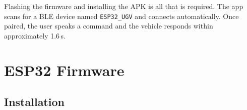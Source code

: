 \documentclass[conference]{IEEEtran}
\begin{document}
	
	Flashing the firmware and installing the APK is all that is required.
	The app scans for a BLE device named \texttt{ESP32\_UGV} and connects
	automatically. Once paired, the user speaks a command and the vehicle
	responds within approximately 1.6\,s.
	

	
\section{ESP32 Firmware} \label{app:esp32}
\subsection{Installation} 
	
\end{document}
